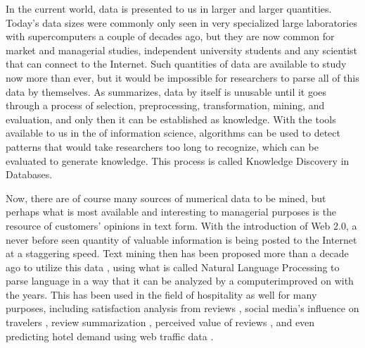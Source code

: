In the current world, data is presented to us in larger and larger quantities. Today's data sizes were commonly only seen in very specialized large laboratories with supercomputers a couple of decades ago, but they are now common for market and managerial studies, independent university students and any scientist that can connect to the Internet. Such quantities of data are available to study now more than ever, but it would be impossible for researchers to parse all of this data by themselves. As \cite{fayyad1996data} summarizes, data by itself is unusable until it goes through a process of selection, preprocessing, transformation, mining, and evaluation, and only then it can be established as knowledge. With the tools available to us in the \DIFdelbegin {}\DIFdelend \DIFaddbegin {}\DIFaddend of information science, algorithms can be used to detect patterns that would take researchers too long to recognize, which can be evaluated to generate knowledge. This process is called Knowledge Discovery in Databases. 

Now, there are of course many sources of numerical data to be mined, but perhaps what is most available and interesting to managerial purposes is the resource of customers' opinions in text form. With the introduction of Web 2.0, a never before seen quantity of valuable information is being posted to the Internet at a staggering speed. Text mining then has been proposed more than a decade ago to utilize this data \cite[e.g.][]{rajman1998text,nahm2002text}, using what is called Natural Language Processing to parse language in a way that it can be analyzed by a computer\DIFdelbegin {}\DIFdelend \DIFaddbegin {}\DIFaddend improved on with the years. This has been used in the field of hospitality as well for many purposes, including satisfaction analysis from reviews \cite[e.g][]{berezina2016, xu2016, xiang2015, hargreaves2015, balbi2018}, social media's influence on travelers \cite[e.g.][]{xiang2010}, review summarization \cite[e.g.][]{hu2017436}, perceived value of reviews \cite[e.g][]{FANG2016498}, and even predicting hotel demand using web traffic data \cite[e.g][]{yang2014}.

